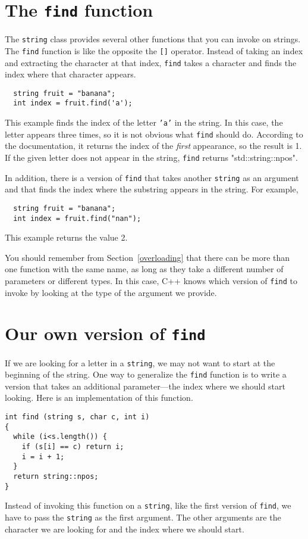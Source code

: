\section{The {\tt find} function}

The {\tt string} class provides several other functions that you can
invoke on strings.  The {\tt find} function is like the opposite the
{\tt []} operator.  Instead of taking an index and extracting the
character at that index, {\tt find} takes a character and finds the
index where that character appears.

\begin{verbatim}
  string fruit = "banana";
  int index = fruit.find('a');
\end{verbatim}
%
This example finds the index of the letter {\tt 'a'} in the string.
In this case, the letter appears three times, so it is not obvious
what {\tt find} should do.  According to the documentation, it returns
the index of the {\em first} appearance, so the result is 1.  If the
given letter does not appear in the string, {\tt find} returns "std::string::npos".

In addition, there is a
version of {\tt find} that takes another {\tt string} as
an argument and that finds the index where the substring
appears in the string.  For example,

\begin{verbatim}
  string fruit = "banana";
  int index = fruit.find("nan");
\end{verbatim}
%
This example returns the value 2.

You should remember from Section~\ref{overloading} that there
can be more than one function with the same name, as long as they
take a different number of parameters or different types.  In
this case, C++ knows which version of {\tt find} to invoke
by looking at the type of the argument we provide.

\section{Our own version of {\tt find}}

If we are looking for a letter in a {\tt string}, we may
not want to start at the beginning of the string.  One way
to generalize the {\tt find} function is to write a version
that takes an additional parameter---the index where we should
start looking.  Here is an implementation of this function.

\begin{verbatim}
int find (string s, char c, int i)
{
  while (i<s.length()) {
    if (s[i] == c) return i;
    i = i + 1;
  }
  return string::npos;
}
\end{verbatim}
%
Instead of invoking this function on a {\tt string}, like
the first version of {\tt find}, we have to pass the {\tt string}
as the first argument.  The other arguments are the character
we are looking for and the index where we should start.

